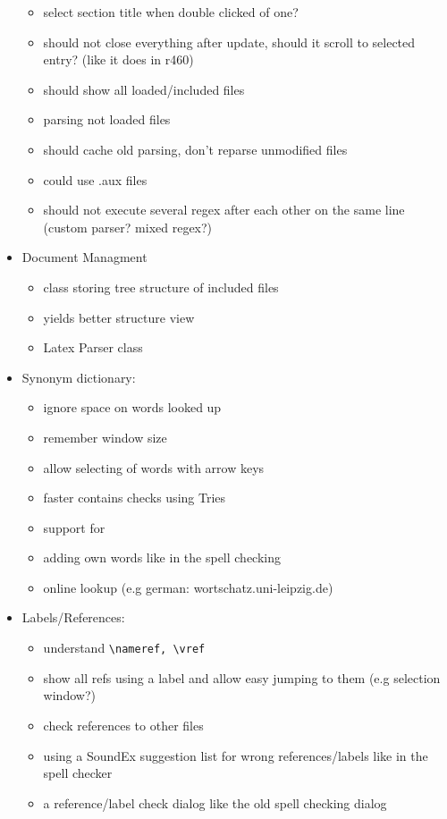 \documentclass[10pt,a4paper,landscape]{report}
\begin{document}
\begin{itemize}
\begin{itemize}
		\item select section title when double clicked of one?
		\item should not close everything after update, should it scroll to selected entry? (like it does in r460)
		\item should show all loaded/included files
		\item parsing not loaded files
		\item should cache old parsing, don't reparse unmodified files
		\item could use .aux files
		\item should not execute several regex after each other on the same line (custom parser? mixed regex?)	
	\end{itemize}
	\item Document Managment \begin{itemize}
		\item class storing tree structure of included files
		\item yields better structure view
		\item Latex Parser class
	\end{itemize}
	\item Synonym dictionary: \begin{itemize}
		\item ignore space on words looked up
		\item remember window size
		\item allow selecting of words with arrow keys
		\item faster contains checks using Tries
		\item support for 
		\item adding own words like in the spell checking 
		\item online lookup (e.g german: wortschatz.uni-leipzig.de)
	\end{itemize}
	\item Labels/References: \begin{itemize}
		\item understand \verb+\nameref, \vref+
		\item 	show all refs using a label and allow easy jumping to them (e.g selection window?)
		\item check references to other files
		\item using a SoundEx suggestion list for wrong references/labels like in the spell checker
		\item a reference/label check dialog like the old spell checking dialog

\end{itemize}
\end{itemize}
\end{document}
